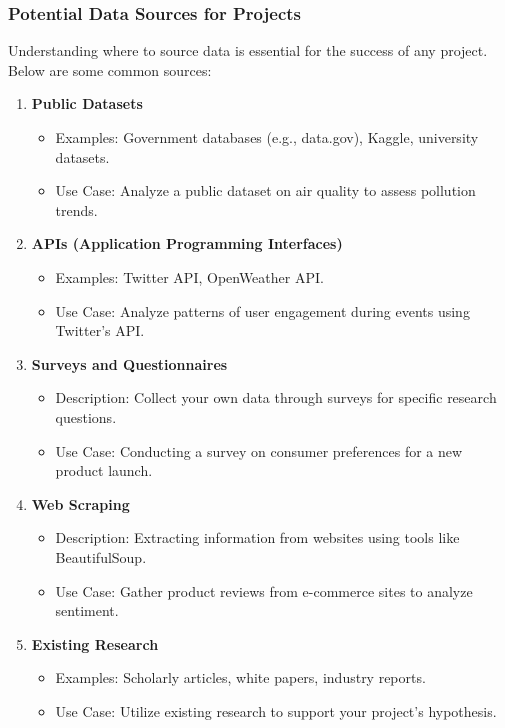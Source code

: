 \documentclass[aspectratio=169]{beamer}
\begin{document}
\begin{frame}[fragile]
    \frametitle{Potential Data Sources for Projects}
    Understanding where to source data is essential for the success of any project. Below are some common sources:
    
    \begin{enumerate}
        \item \textbf{Public Datasets}
        \begin{itemize}
            \item Examples: Government databases (e.g., data.gov), Kaggle, university datasets.
            \item Use Case: Analyze a public dataset on air quality to assess pollution trends.
        \end{itemize}
        
        \item \textbf{APIs (Application Programming Interfaces)}
        \begin{itemize}
            \item Examples: Twitter API, OpenWeather API.
            \item Use Case: Analyze patterns of user engagement during events using Twitter's API.
        \end{itemize}
        
        \item \textbf{Surveys and Questionnaires}
        \begin{itemize}
            \item Description: Collect your own data through surveys for specific research questions.
            \item Use Case: Conducting a survey on consumer preferences for a new product launch.
        \end{itemize}
        
        \item \textbf{Web Scraping}
        \begin{itemize}
            \item Description: Extracting information from websites using tools like BeautifulSoup.
            \item Use Case: Gather product reviews from e-commerce sites to analyze sentiment.
        \end{itemize}
        
        \item \textbf{Existing Research}
        \begin{itemize}
            \item Examples: Scholarly articles, white papers, industry reports.
            \item Use Case: Utilize existing research to support your project's hypothesis.
        \end{itemize}
    \end{enumerate}
\end{frame}
\end{document}
